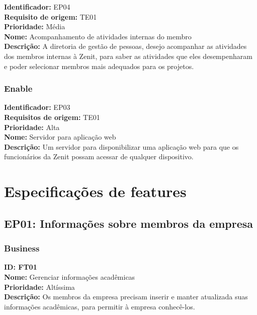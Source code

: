 \begin{anexosenv}
\textbf{Identificador:} EP04\\
\textbf{Requisito de origem:} TE01\\
\textbf{Prioridade:} Média\\
\textbf{Nome:}  Acompanhamento de atividades internas do membro\\
\textbf{Descrição:} A diretoria de gestão de pessoas, desejo acompanhar as atividades dos membros internas à Zenit, para saber as atividades que eles desempenharam e poder selecionar membros mais adequados para os projetos.\\

\subsection[Enable]{Enable}

\textbf{Identificador:} EP03\\
\textbf{Requisitos de origem:} TE01\\
\textbf{Prioridade:} Alta\\
\textbf{Nome:}  Servidor para aplicação web\\
\textbf{Descrição:} Um servidor para disponibilizar uma aplicação web para que os funcionários da Zenit possam acessar de qualquer dispositivo.\\


\chapter{Especificações de features}

\section[EP01: Informações sobre membros da empresa]{EP01: Informações sobre membros da empresa}

\subsection[Business]{Business}

\textbf{ID: FT01\\
Nome:} Gerenciar informações acadêmicas\\
\textbf{Prioridade:} Altíssima\\
\textbf{Descrição:} Os membros da empresa precisam inserir e manter atualizada suas informações acadêmicas, para permitir à empresa conhecê-los.\\


\end{anexosenv}

